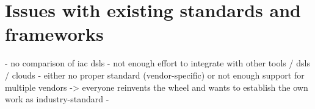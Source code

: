 \section{Issues with existing standards and frameworks}
- no comparison of iac dsls
- not enough effort to integrate with other tools / dsls / clouds
- either no proper standard (vendor-specific) or not enough support for multiple vendors -> everyone reinvents the wheel and wants to establish the own work as industry-standard
- %






